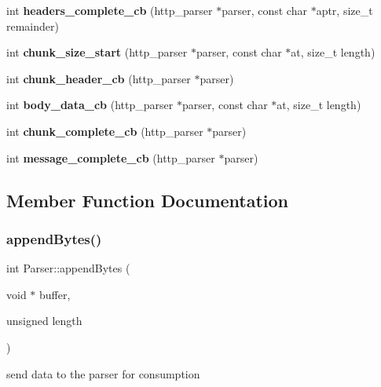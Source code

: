 \begin{DoxyCompactItemize}
int {\bfseries headers\+\_\+complete\+\_\+cb} (http\+\_\+parser $\ast$parser, const char $\ast$aptr, size\+\_\+t remainder)
\item 
\mbox{\label{class_parser_a6a11778033c82b51021c9f7af6796d49}} 
int {\bfseries chunk\+\_\+size\+\_\+start} (http\+\_\+parser $\ast$parser, const char $\ast$at, size\+\_\+t length)
\item 
\mbox{\label{class_parser_ac54638bfd9ba21a338f3ed6decd587c9}} 
int {\bfseries chunk\+\_\+header\+\_\+cb} (http\+\_\+parser $\ast$parser)
\item 
\mbox{\label{class_parser_a63771c42c64eca8eb6ebaba249a241de}} 
int {\bfseries body\+\_\+data\+\_\+cb} (http\+\_\+parser $\ast$parser, const char $\ast$at, size\+\_\+t length)
\item 
\mbox{\label{class_parser_a9944899a787daa6ff1a03c3c8db106ac}} 
int {\bfseries chunk\+\_\+complete\+\_\+cb} (http\+\_\+parser $\ast$parser)
\item 
\mbox{\label{class_parser_a74c8ba05a16748266ea355b8fe4d1626}} 
int {\bfseries message\+\_\+complete\+\_\+cb} (http\+\_\+parser $\ast$parser)
\end{DoxyCompactItemize}


\subsection{Member Function Documentation}
\mbox{\label{class_parser_a72709d4b733b6ad615669726f77ca52a}} 
\subsubsection{\texorpdfstring{append\+Bytes()}{appendBytes()}}
{\footnotesize\ttfamily int Parser\+::append\+Bytes (\begin{DoxyParamCaption}\item[{void $\ast$}]{buffer,  }\item[{unsigned}]{length }\end{DoxyParamCaption})}

send data to the parser for consumption \mbox{\label{class_parser_ac569347a4bdd7a04ede0c0a4c6efe215}} 
